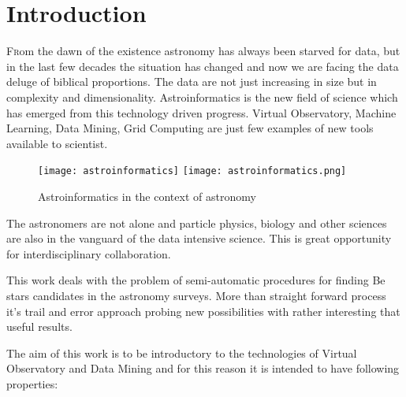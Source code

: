 \chapter*{Introduction}


\renewcommand{\LettrineFontHook}{\color{red}}


\lettrine[lines = 3, loversize=-0.1, lraise=0.1]{F}rom the dawn of the
existence astronomy has always been starved for data, but in the last
few decades the situation has changed and now we are facing the data
deluge of biblical proportions. The data are not just increasing in
size but in complexity and dimensionality. \cite{ballastroinformatics}
Astroinformatics is the new field of science which has emerged from
this technology driven progress.  Virtual Observatory, Machine
Learning, Data Mining, Grid Computing are just few examples of new
tools available to scientist.


\vspace{10pt}
\begin{figure}[!htbp]
  \begin{center}
    \leavevmode
    \ifpdf
    \texttt{[image: astroinformatics]}
    \else
    \texttt{[image: astroinformatics.png]}
    \fi
    \caption{Astroinformatics in the context of astronomy \cite{ballastroinformatics} }
    \label{FigAir}
  \end{center}
\end{figure}
\vspace{-10pt}



The astronomers are not alone and particle physics, biology and other
sciences are also in the vanguard of the data intensive science. This
is great opportunity for interdisciplinary collaboration.

This work deals with the problem of semi-automatic procedures for
finding Be stars \cite{porter2003classical} candidates in the
astronomy surveys. More than straight forward process it's trail and
error approach probing new possibilities with rather interesting that
useful results.

The aim of this work is to be introductory to the technologies of
Virtual Observatory and Data Mining and for this reason it is intended
to have following properties:

